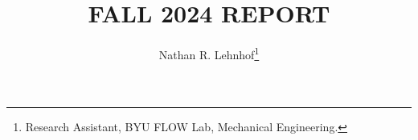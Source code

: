 \documentclass[journal]{new-aiaa} %
\title{FALL 2024 REPORT}
\author{Nathan R. Lehnhof\footnote{Research Assistant, BYU FLOW Lab, Mechanical Engineering.}}
\affil{Brigham Young University, Provo, Utah, 84606}
\begin{document}
\maketitle %

\begin{abstract}
	
	









	
	
	
		
		
		
		
		
		
		
	
	

\end{abstract}



\end{document}
